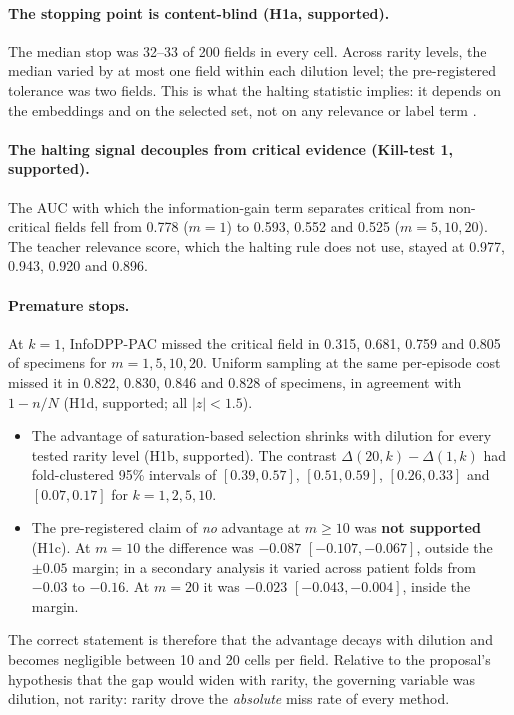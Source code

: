 \documentclass[11pt]{article}
\theoremstyle{remark}
\theoremstyle{definition}
\begin{document}
\paragraph{The stopping point is content-blind (H1a, supported).} The median stop was 32--33 of 200 fields in every cell. Across rarity levels, the median varied by at most one field within each dilution level; the pre-registered tolerance was two fields. This is what the halting statistic implies: it depends on the embeddings and on the selected set, not on any relevance or label term \cite{mittal2026infodpp}.

\paragraph{The halting signal decouples from critical evidence (Kill-test 1, supported).} The AUC with which the information-gain term separates critical from non-critical fields fell from 0.778 ($m=1$) to 0.593, 0.552 and 0.525 ($m=5,10,20$). The teacher relevance score, which the halting rule does not use, stayed at 0.977, 0.943, 0.920 and 0.896.

\paragraph{Premature stops.} At $k=1$, InfoDPP-PAC missed the critical field in 0.315, 0.681, 0.759 and 0.805 of specimens for $m=1,5,10,20$. Uniform sampling at the same per-episode cost missed it in 0.822, 0.830, 0.846 and 0.828 of specimens, in agreement with $1-n/N$ (H1d, supported; all $|z|<1.5$).
\begin{itemize}
\item The advantage of saturation-based selection shrinks with dilution for every tested rarity level (H1b, supported). The contrast $\Delta(20,k)-\Delta(1,k)$ had fold-clustered 95\% intervals of $[0.39,0.57]$, $[0.51,0.59]$, $[0.26,0.33]$ and $[0.07,0.17]$ for $k=1,2,5,10$.
\item The pre-registered claim of \emph{no} advantage at $m\ge10$ was \textbf{not supported} (H1c). At $m=10$ the difference was $-0.087$ $[-0.107,-0.067]$, outside the $\pm0.05$ margin; in a secondary analysis it varied across patient folds from $-0.03$ to $-0.16$. At $m=20$ it was $-0.023$ $[-0.043,-0.004]$, inside the margin.
\end{itemize}
The correct statement is therefore that the advantage decays with dilution and becomes negligible between 10 and 20 cells per field. Relative to the proposal's hypothesis that the gap would widen with rarity, the governing variable was dilution, not rarity: rarity drove the \emph{absolute} miss rate of every method.
\end{document}
